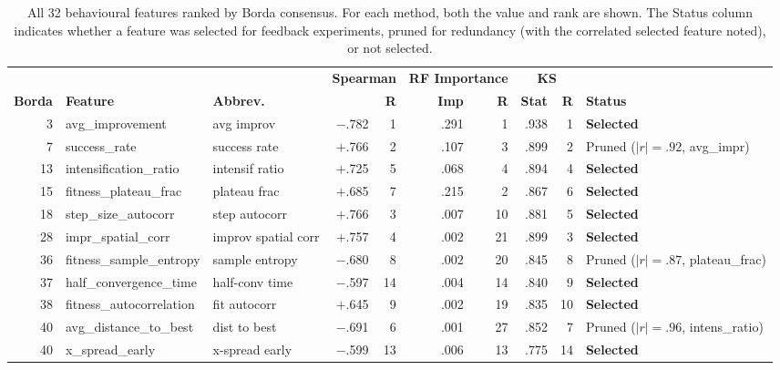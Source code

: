 \begin{table}[p]
\centering
\caption{All 32 behavioural features ranked by Borda consensus. For each method, both the value and rank are shown. The Status column indicates whether a feature was selected for feedback experiments, pruned for redundancy (with the correlated selected feature noted), or not selected.}
\label{tab:feature-consensus}
\footnotesize
\setlength{\tabcolsep}{3.5pt}
\begin{tabular}{@{}rllrrrrrrl@{}}
\toprule
& & & \multicolumn{2}{c}{\textbf{Spearman}} & \multicolumn{2}{c}{\textbf{RF Importance}} & \multicolumn{2}{c}{\textbf{KS}} & \\
\cmidrule(lr){4-5} \cmidrule(lr){6-7} \cmidrule(lr){8-9}
\textbf{Borda} & \textbf{Feature} & \textbf{Abbrev.} & \boldmath{$\rho$} & \textbf{R} & \textbf{Imp} & \textbf{R} & \textbf{Stat} & \textbf{R} & \textbf{Status} \\
\midrule
3  & avg\_improvement              & avg improv & $-$.782 &  1 & .291 &  1 & .938 &  1 & \textbf{Selected} \\
7  & success\_rate                 & success rate & $+$.766 &  2 & .107 &  3 & .899 &  2 & Pruned ($|r|{=}.92$, avg\_impr) \\
13 & intensification\_ratio        & intensif ratio & $+$.725 &  5 & .068 &  4 & .894 &  4 & \textbf{Selected} \\
15 & fitness\_plateau\_frac        & plateau frac & $+$.685 &  7 & .215 &  2 & .867 &  6 & \textbf{Selected} \\
18 & step\_size\_autocorr          & step autocorr & $+$.766 &  3 & .007 & 10 & .881 &  5 & \textbf{Selected} \\
28 & impr\_spatial\_corr           & improv spatial corr & $+$.757 &  4 & .002 & 21 & .899 &  3 & \textbf{Selected} \\
36 & fitness\_sample\_entropy      & sample entropy & $-$.680 &  8 & .002 & 20 & .845 &  8 & Pruned ($|r|{=}.87$, plateau\_frac) \\
37 & half\_convergence\_time       & half-conv time & $-$.597 & 14 & .004 & 14 & .840 &  9 & \textbf{Selected} \\
38 & fitness\_autocorrelation      & fit autocorr & $+$.645 &  9 & .002 & 19 & .835 & 10 & \textbf{Selected} \\
40 & avg\_distance\_to\_best       & dist to best & $-$.691 &  6 & .001 & 27 & .852 &  7 & Pruned ($|r|{=}.96$, intens\_ratio) \\
40 & x\_spread\_early              & x-spread early & $-$.599 & 13 & .006 & 13 & .775 & 14 & \textbf{Selected} \\

\end{tabular}
\end{table}
